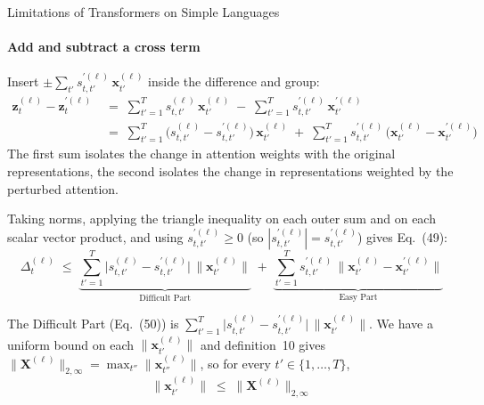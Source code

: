 \begin{question}{Limitations of Transformers on Simple Languages}
\begin{subquestion}
    \paragraph{Add and subtract a cross term}
    Insert $\pm \sum_{t'} s_{t,t'}^{\prime(\ell)}\, \mathbf{x}_{t'}^{(\ell)}$ inside the difference and group:
    \begin{align*}
        \mathbf{z}_t^{(\ell)} - \mathbf{z}_t^{\prime(\ell)}
        &\;=\; \sum_{t'=1}^{T} s_{t,t'}^{(\ell)}\, \mathbf{x}_{t'}^{(\ell)} \;-\; \sum_{t'=1}^{T} s_{t,t'}^{\prime(\ell)}\, \mathbf{x}_{t'}^{\prime(\ell)} \\
        &\;=\; \sum_{t'=1}^{T} \bigl(s_{t,t'}^{(\ell)} - s_{t,t'}^{\prime(\ell)}\bigr)\, \mathbf{x}_{t'}^{(\ell)}
        \;+\; \sum_{t'=1}^{T} s_{t,t'}^{\prime(\ell)}\, \bigl(\mathbf{x}_{t'}^{(\ell)} - \mathbf{x}_{t'}^{\prime(\ell)}\bigr)
    \end{align*}
    The first sum isolates the change in attention weights with the original representations, the second isolates the change in representations weighted by the perturbed attention.

    Taking norms, applying the triangle inequality on each outer sum and on each scalar vector product, and using $s_{t,t'}^{\prime(\ell)} \ge 0$ (so $|s_{t,t'}^{\prime(\ell)}| = s_{t,t'}^{\prime(\ell)}$) gives Eq.~(49):
    \begin{equation*}
        \Delta_t^{(\ell)} \;\le\; \underbrace{\sum_{t'=1}^{T} \bigl|s_{t,t'}^{(\ell)} - s_{t,t'}^{\prime(\ell)}\bigr|\, \|\mathbf{x}_{t'}^{(\ell)}\|}_{\text{Difficult Part}}
        \;+\; \underbrace{\sum_{t'=1}^{T} s_{t,t'}^{\prime(\ell)}\, \|\mathbf{x}_{t'}^{(\ell)} - \mathbf{x}_{t'}^{\prime(\ell)}\|}_{\text{Easy Part}}
    \end{equation*}
\end{subquestion}

\begin{subquestion}
    The Difficult Part (Eq.~(50)) is $\sum_{t'=1}^{T} \bigl|s_{t,t'}^{(\ell)} - s_{t,t'}^{\prime(\ell)}\bigr|\, \|\mathbf{x}_{t'}^{(\ell)}\|$. 
    We have a uniform bound on each $\|\mathbf{x}_{t'}^{(\ell)}\|$ and definition~10 gives $\|\mathbf{X}^{(\ell)}\|_{2,\infty} = \max_{t''} \|\mathbf{x}_{t''}^{(\ell)}\|$, so for every $t' \in \{1, \dots, T\}$,
    \begin{equation*}
        \|\mathbf{x}_{t'}^{(\ell)}\| \;\le\; \|\mathbf{X}^{(\ell)}\|_{2,\infty}
    \end{equation*}


\end{subquestion}
\end{question}

